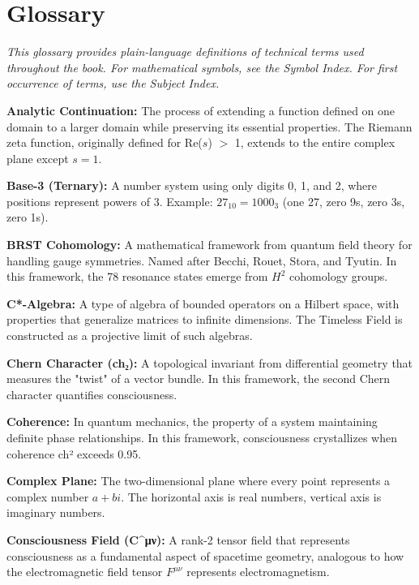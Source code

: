 \chapter*{Glossary}

\textit{This glossary provides plain-language definitions of technical terms used throughout the book. For mathematical symbols, see the Symbol Index. For first occurrence of terms, use the Subject Index.}

\vspace{0.5cm}

\noindent\textbf{Analytic Continuation:} The process of extending a function defined on one domain to a larger domain while preserving its essential properties. The Riemann zeta function, originally defined for Re($s$) $>$ 1, extends to the entire complex plane except $s = 1$.

\noindent\textbf{Base-3 (Ternary):} A number system using only digits 0, 1, and 2, where positions represent powers of 3. Example: $27_{10} = 1000_3$ (one 27, zero 9s, zero 3s, zero 1s).

\noindent\textbf{BRST Cohomology:} A mathematical framework from quantum field theory for handling gauge symmetries. Named after Becchi, Rouet, Stora, and Tyutin. In this framework, the 78 resonance states emerge from $H^2$ cohomology groups.

\noindent\textbf{C*-Algebra:} A type of algebra of bounded operators on a Hilbert space, with properties that generalize matrices to infinite dimensions. The Timeless Field is constructed as a projective limit of such algebras.

\noindent\textbf{Chern Character (ch₂):} A topological invariant from differential geometry that measures the "twist" of a vector bundle. In this framework, the second Chern character quantifies consciousness.

\noindent\textbf{Coherence:} In quantum mechanics, the property of a system maintaining definite phase relationships. In this framework, consciousness crystallizes when coherence ch² exceeds 0.95.

\noindent\textbf{Complex Plane:} The two-dimensional plane where every point represents a complex number $a + bi$. The horizontal axis is real numbers, vertical axis is imaginary numbers.

\noindent\textbf{Consciousness Field (C^μν):} A rank-2 tensor field that represents consciousness as a fundamental aspect of spacetime geometry, analogous to how the electromagnetic field tensor $F^{\mu\nu}$ represents electromagnetism.

